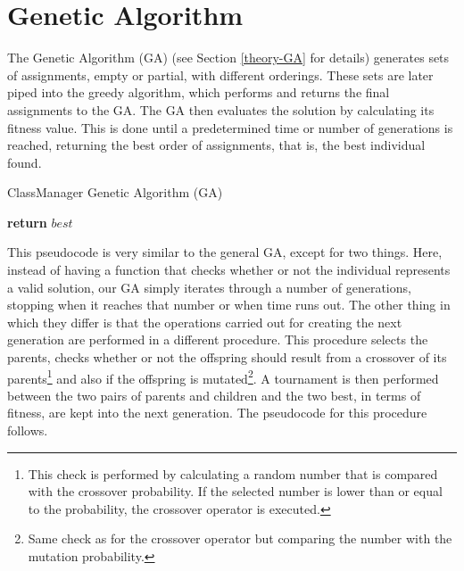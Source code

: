 \section{Genetic Algorithm}

The Genetic Algorithm (GA) (see Section \ref{theory-GA} for details) generates sets of assignments, empty or partial, with different orderings. These sets are later piped into the greedy algorithm, which performs and returns the final assignments to the GA. The GA then evaluates the solution by calculating its fitness value. This is done until a predetermined time or number of generations is reached, returning the best order of assignments, that is, the best individual found.

\begin{algorithm}[H]
    \caption{ClassManager Genetic Algorithm (GA)}
    \begin{algorithmic}[1]
            \EndFor
            \Repeat
                    \EndIf
                \EndFor
            \State \textbf{return} $best$
        \EndProcedure
    \end{algorithmic}
\end{algorithm}

This pseudocode is very similar to the general GA, except for two things. Here, instead of having a function that checks whether or not the individual represents a valid solution, our GA simply iterates through a number of generations, stopping when it reaches that number or when time runs out. The other thing in which they differ is that the operations carried out for creating the next generation are performed in a different procedure. This procedure selects the parents, checks whether or not the offspring should result from a crossover of its parents\footnote{This check is performed by calculating a random number that is compared with the crossover probability. If the selected number is lower than or equal to the probability, the crossover operator is executed.} and also if the offspring is mutated\footnote{Same check as for the crossover operator but comparing the number with the mutation probability.}. A tournament is then performed between the two pairs of parents and children and the two best, in terms of fitness, are kept into the next generation. The pseudocode for this procedure follows.

